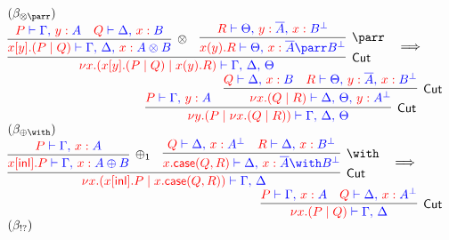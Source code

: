 \begin{figure*}
\[\colored
\begin{array}{c}
\multicolumn{1}{l}{(\beta_{\otimes\parr})}\filler \\ %
\vcenter{
  \inference{
    \inference{
      \tm{P} \tpvdash \tp{\Gamma \comma \tmof{y}A}
      &
      \tm{Q} \tpvdash \tp{\Delta \comma \tmof{x}B}
    }{\otimes}{
      \tm{x[y].(P \mid Q)} \tpvdash
        \tp{\Gamma \comma \Delta \comma \tmof{x}A \otimes B}
    } 
    &
    \inference{
      \tm{R} \tpvdash
        \tp{\Theta \comma \tmof{y}\dual{A} \comma \tmof{x}\dualbt{B}}
    }{\parr}{
      \tm{x(y).R} \tpvdash
        \tp{\Theta \comma \tmof{x}\dual{A} \parr \dualbt{B}}
    } 
  }{Cut}{
    \tm{\nu x\Of{A \otimes B}.(x[y].(P \mid Q) \mid x(y).R)} \tpvdash
      \tp{\Gamma \comma \Delta \comma \Theta}
  }
}  \quad \becomes \hfill
\\
\hfill
\vcenter{
  \inference{
      \tm{P} \tpvdash \tp{\Gamma \comma \tmof{y}A}
      &
      \inference{
        \tm{Q} \tpvdash \tp{\Delta \comma \tmof{x}B}
        &
        \tm{R} \tpvdash
          \tp{\Theta \comma \tmof{y}\dual{A} \comma \tmof{x}\dualbt{B}}
      }{Cut}{
        \tm{\nu x \Of{B}.(Q \mid R)} \tpvdash
          \tp{\Delta \comma \Theta \comma \tmof{y}\dualbt{A}}
      }
    }{Cut}{
      \tm{\nu y \Of{A}.(P \mid \nu x.(Q \mid R))} \tpvdash
         \tp{\Gamma \comma \Delta \comma \Theta}
    }
  }
\\
\multicolumn{1}{l}{(\beta_{\oplus\with})} \\ %
\vcenter{
  \inference{
    \inference{
      \tm{P} \tpvdash \tp{\Gamma \comma \tmof{x}A}
    }{\oplus_1}{
      \tm{x[\inlterm].P} \tpvdash \tp{\Gamma \comma \tmof{x}A \oplus B}
    } 
    &
    \inference{
      \tm{Q} \tpvdash \tp{\Delta \comma \tmof{x}\dualbt{A}}
      &
      \tm{R} \tpvdash \tp{\Delta \comma \tmof{x}\dualbt{B}}
    }{\with}{
      \tm{x.\caseterm(Q,R)} \tpvdash
        \tp{\Delta \comma \tmof{x}\dual{A} \with \dualbt{B}}
    } 
  }{Cut}{
    \tm{\nu x \Of{A \oplus B}.(x[\inlterm].P \mid x.\caseterm(Q,R))}
      \tpvdash \tp{\Gamma \comma \Delta}
  }
}
\quad \becomes \hfill
\\
\hfill
\vcenter{
  \inference{
    \tm{P} \tpvdash \tp{\Gamma \comma \tmof{x}A}
    &
    \tm{Q} \tpvdash \tp{\Delta \comma \tmof{x}\dualbt{A}}
  }{Cut}{
    \tm{\nu x \Of{A}.(P \mid Q)} \tpvdash \tp{\Gamma \comma \Delta}
  }
}
\\
\multicolumn{1}{l}{(\beta_{!?})} \\ %

\end{array}\]
\end{figure*}

